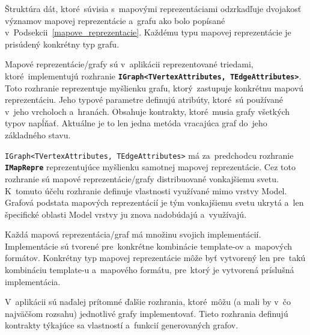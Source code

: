 \bigskip

Štruktúra dát, ktoré~súvisia s~mapovými reprezentáciami odzrkadľuje dvojakosť významov mapovej reprezentácie a~grafu ako bolo popísané v~Podsekcii~\ref{mapove_reprezentacie}. Každému typu mapovej reprezentácie je prisúdený konkrétny typ grafu.

Mapové reprezentácie/grafy sú v~aplikácii reprezentované triedami, ktoré~implementujú rozhranie \textbf{\texttt{IGraph<TVertexAttributes, TEdgeAttributes>}}. Toto rozhranie reprezentuje myšlienku grafu, ktorý~zastupuje konkrétnu mapovú reprezentáciu. Jeho typové parametre definujú atribúty, ktoré~sú používané v~jeho vrcholoch a~hranách. Obsahuje kontrakty, ktoré~musia grafy všetkých typov napĺňať. Aktuálne je to len jedna metóda vracajúca graf do~jeho základného stavu.

\texttt{IGraph<TVertexAttributes, TEdgeAttributes>} má za~predchodcu rozhranie \textbf{\texttt{IMapRepre}} reprezentujúce myšlienku samotnej mapovej reprezentácie. Cez toto rozhranie sú mapové reprezentácie/grafy distribuované vonkajšiemu svetu. K~tomuto účelu rozhranie definuje vlastnosti využívané mimo vrstvy Model. Grafová podstata mapových reprezentácií je tým vonkajšiemu svetu ukrytá a~len špecifické oblasti Model vrstvy ju znova nadobúdajú a~využívajú.

Každá mapová reprezentácia/graf má množinu svojich implementácií. Implementácie sú tvorené pre~konkrétne kombinácie template-ov a~mapových formátov. Konkrétny typ mapovej reprezentácie môže byť vytvorený len pre~takú kombináciu template-u a~mapového formátu, pre~ktorý je vytvorená príslušná implementácia.

V~aplikácii sú naďalej prítomné ďalšie rozhrania, ktoré~môžu (a mali by v~čo najväčšom rozsahu) jednotlivé grafy implementovať. Tieto rozhrania definujú kontrakty týkajúce sa vlastností a~funkcií generovaných grafov.

\bigskip

